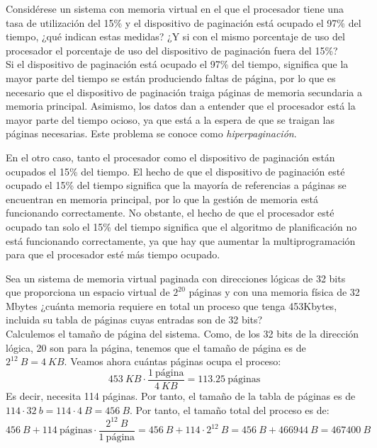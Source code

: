 \begin{ejercicio}
Considérese un sistema con memoria virtual en el que el procesador tiene una tasa de utilización del 15\% y el dispositivo de paginación está ocupado el 97\% del tiempo,
¿qué indican estas medidas? ¿Y si con el mismo porcentaje de uso del procesador el porcentaje de uso del dispositivo de paginación fuera del 15\%?\\

Si el dispositivo de paginación está ocupado el 97\% del tiempo, significa que la mayor parte del tiempo se están produciendo faltas de página, por lo que
es necesario que el dispositivo de paginación traiga páginas de memoria secundaria a memoria principal. Asimismo, los datos dan a entender que el procesador
está la mayor parte del tiempo ocioso, ya que está a la espera de que se traigan las páginas necesarias. Este problema se conoce como \emph{hiperpaginación}.

En el otro caso, tanto el procesador como el dispositivo de paginación están ocupados el 15\% del tiempo. El hecho de que el dispositivo de paginación esté ocupado
el 15\% del tiempo significa que la mayoría de referencias a páginas se encuentran en memoria principal, por lo que la gestión de memoria está funcionando correctamente.
No obstante, el hecho de que el procesador esté ocupado tan solo el 15\% del tiempo significa que el algoritmo de planificación no está funcionando correctamente, ya que hay que aumentar
la multiprogramación para que el procesador esté más tiempo ocupado.
\end{ejercicio}

\begin{ejercicio}
Sea un sistema de memoria virtual paginada con direcciones lógicas de 32 bits que
proporciona un espacio virtual de \(2^{20}\) páginas y con una memoria física de
32 Mbytes
¿cuánta memoria requiere en total un proceso que tenga 453Kbytes,
incluida su tabla de páginas cuyas entradas son de 32 bits?\\

    Calculemos el tamaño de página del sistema. Como, de los 32 bits de la dirección lógica,
    20 son para la página, tenemos que el tamaño de página es de $2^{12}~B=4~KB$. Veamos ahora cuántas
    páginas ocupa el proceso:
    \begin{equation*}
        453~KB \cdot \frac{1~\text{página}}{4~KB} = 113.25~\text{páginas}
    \end{equation*}
    Es decir, necesita 114 páginas. Por tanto, el tamaño de la tabla de páginas es de $114\cdot 32~b=114\cdot 4~B=456~B$.
    Por tanto, el tamaño total del proceso es de:
    \begin{equation*}
        456~B + 114~\text{páginas} \cdot \frac{2^{12}~B}{1~\text{página}} = 456~B + 114\cdot 2^{12}~B = 456~B + 466944~B = 467400~B
    \end{equation*}
\end{ejercicio}

